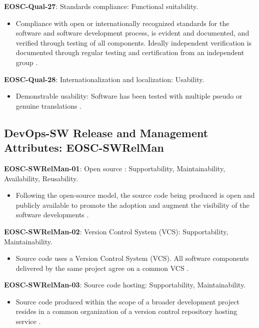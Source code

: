 \textbf{EOSC-Qual-27}: Standards compliance: Functional suitability.

\begin{itemize}
    \item Compliance with open or internationally recognized standards for the software and software development process, is evident and documented, and verified through testing of all components. Ideally independent verification is documented through regular testing and certification from an independent group \cite{shepherdson_cessda_2019}.
\end{itemize}

\textbf{EOSC-Qual-28}: Internationalization and localization: Usability.

\begin{itemize}
    \item Demonstrable usability: Software has been tested with multiple pseudo or genuine translations \cite{shepherdson_cessda_2019}.
\end{itemize}

\subsection{DevOps-SW Release and Management Attributes: EOSC-SWRelMan}

\textbf{EOSC-SWRelMan-01}: Open source : Supportability, Maintainability, Availability, Reusability.

\begin{itemize}
    \item Following the open-source model, the source code being produced is open and publicly available to promote the adoption and augment the visibility of the software developments \cite{orviz_set_2017,raymond_software_2013}.
\end{itemize}

\textbf{EOSC-SWRelMan-02}: Version Control System (VCS): Supportability, Maintainability.

\begin{itemize}
    \item Source code uses a Version Control System (VCS). All software components delivered by the same project agree on a common VCS \cite{orviz_set_2017}.
\end{itemize}

\textbf{EOSC-SWRelMan-03}: Source code hosting: Supportability, Maintainability.

\begin{itemize}
    \item Source code produced within the scope of a broader development project resides in a common organization of a version control repository hosting service \cite{orviz_set_2017}.
\end{itemize}

